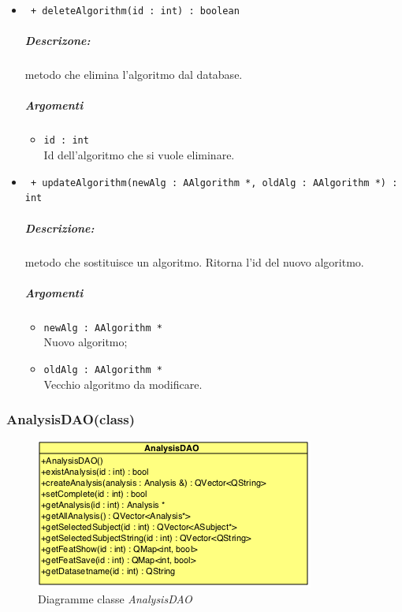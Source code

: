 \begin{itemize}
		\item \color{blue}\verb! + deleteAlgorithm(id : int) : boolean!\\
		\color{black}
		\subparagraph{Descrizone:} metodo che elimina l'algoritmo dal database.
		\subparagraph{Argomenti}
			\begin{itemize}
				\item \color{RoyalPurple}\verb!id : int!\\
				\color{black}Id dell'algoritmo che si vuole eliminare.
			\end{itemize}
			
		\item \color{blue}\verb! + updateAlgorithm(newAlg : AAlgorithm *, oldAlg : AAlgorithm *) : int!\\
		\color{black}
		\subparagraph{Descrizione:} metodo che sostituisce un algoritmo\g{}. Ritorna l'id del nuovo algoritmo.
		\subparagraph{Argomenti}
			\begin{itemize}
				\item \color{RoyalPurple}\verb!newAlg : AAlgorithm *!\\
				\color{black}Nuovo algoritmo;
				
				\item \color{RoyalPurple}\verb!oldAlg : AAlgorithm *!\\
				\color{black}Vecchio algoritmo da modificare.
			\end{itemize}

	\end{itemize}

\color{black}

\pagebreak

\subsubsection{AnalysisDAO(class)}
\label{speanalysisdao}
\begin{figure}[!h]
\centering
			\includegraphics[scale=1]{./Content/Immagini/model/AnalysisDAO.png}
			\caption{Diagramme classe \textsl{AnalysisDAO}}
			\label{cl_analysisdao}
\end{figure}

